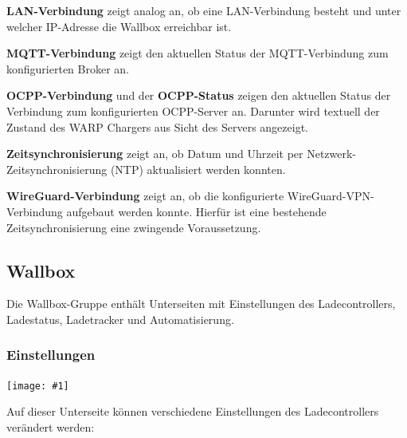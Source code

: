 \documentclass[a4paper,10pt]{article}
\newcommand{\gfx}[1]{\texttt{[image: \#1]}}
\begin{document}
\begin{multicols*}{2}
    \textbf{LAN-Verbindung} zeigt analog an, ob eine LAN-Verbindung besteht und unter welcher IP-Adresse die Wallbox erreichbar ist.

    \textbf{MQTT-Verbindung} zeigt den aktuellen Status der MQTT-Verbindung
    zum konfigurierten Broker an.

    \textbf{OCPP-Verbindung} und der \textbf{OCPP-Status} zeigen den aktuellen Status der Verbindung zum konfigurierten OCPP-Server an.
    Darunter wird textuell der Zustand des WARP Chargers aus Sicht des Servers angezeigt.

    \textbf{Zeitsynchronisierung} zeigt an, ob Datum und Uhrzeit per Netzwerk-Zeitsynchronisierung (NTP) aktualisiert werden konnten.

    \textbf{WireGuard-Verbindung} zeigt an, ob die konfigurierte WireGuard-VPN-Verbindung aufgebaut werden konnte. Hierfür ist eine bestehende Zeitsynchronisierung eine zwingende Voraussetzung.

    \subsection{Wallbox}
    Die Wallbox-Gruppe enthält Unterseiten mit Einstellungen des
	Ladecontrollers, Ladestatus, Ladetracker und Automatisierung.

    \subsubsection{Einstellungen}\label{evse-settings}
    \gfx{./img_warp2/resized/web_evse2_settings}

    Auf dieser Unterseite können verschiedene Einstellungen des Ladecontrollers verändert werden:


\end{multicols*}
\end{document}
